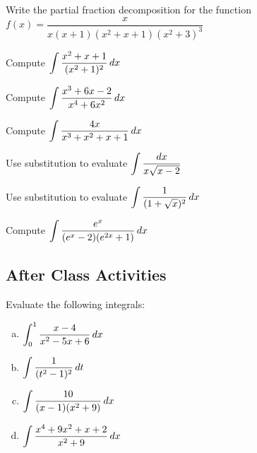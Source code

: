 \documentclass[notes]{subfiles}
\begin{document}
		\begin{ex}
			Write the partial fraction decomposition for the function\\ $f(x) = \dfrac{x}{x(x+1)(x^2+x+1)(x^2+3)^3}$
		\end{ex}
			
		\begin{ex}
			Compute $\displaystyle \int \dfrac{x^2+x+1}{(x^2+1)^2}\, dx$
		\end{ex}
			\newpage
			
		\begin{ex}
			Compute $\displaystyle \int \dfrac{x^3+6x-2}{x^4+6x^2}\, dx$
		\end{ex}
			\newpage
			
		\begin{ex}
			Compute $\displaystyle\int \dfrac{4x}{x^3 + x^2 + x + 1}\, dx$
		\end{ex}
			
		\begin{ex}
			Use substitution to evaluate $\displaystyle \int \dfrac{dx}{x\sqrt{x-2}}$
		\end{ex}
			\newpage
			
		\begin{ex}
			Use substitution to evaluate $\displaystyle \int \dfrac{1}{(1+\sqrt{x})^2}\, dx$
		\end{ex}
			
		\begin{ex}
			Compute $\displaystyle \int \dfrac{e^x}{(e^x-2)(e^{2x}+1)}\, dx$
		\end{ex}
			\newpage
			
			
	
	\subsection*{After Class Activities}
		\begin{ex}
			Evaluate the following integrals:
			\begin{enumerate}[(a)]
				\item $\displaystyle \int_0^1 \dfrac{x-4}{x^2-5x+6}\, dx$
					
				\item $\displaystyle \int \dfrac{1}{(t^2-1)^2}\, dt$
					\newpage
					
				\item $\displaystyle \int \dfrac{10}{(x-1)(x^2+9)}\, dx$
					
				\item $\displaystyle \int \dfrac{x^4 + 9x^2 + x + 2}{x^2 + 9}\, dx$
			\end{enumerate}
		\end{ex}
\clearpage
\end{document}
